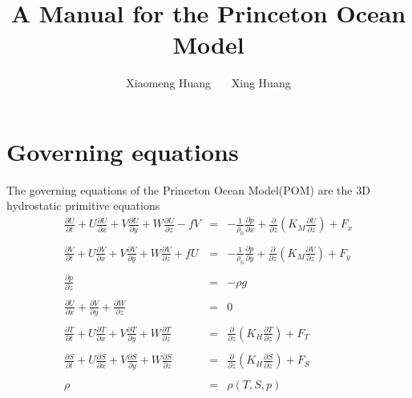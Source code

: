 \documentclass[oribibl]{llncs}
\begin{document}
\title{A Manual for the Princeton Ocean Model}
\author{Xiaomeng Huang \ \ \ Xing Huang}
\maketitle

\section{Governing equations}

The governing equations of the Princeton Ocean Model(POM) are the 3D hydrostatic primitive equations
\begin{eqnarray}
\frac{\partial U}{\partial t}+U\frac{\partial U}{\partial x}+V\frac{\partial U}{\partial y}+W\frac{\partial U}{\partial z} -fV &=& - \frac{1}{\rho_0} \frac{\partial p}{\partial x} + \frac{\partial}{\partial z}  \left ( K_M \frac{\partial U}{\partial z} \right) +F_x\\ \nonumber \\ 
\frac{\partial V}{\partial t}+U\frac{\partial V}{\partial x}+V\frac{\partial V}{\partial y}+W\frac{\partial V}{\partial z} +fU&=& - \frac{1}{\rho_0} \frac{\partial p}{\partial y} + \frac{\partial}{\partial z}  \left ( K_M \frac{\partial V}{\partial z} \right) +F_y\\ \nonumber \\ 
\frac{\partial p}{\partial z} &=& - \rho g \\ \nonumber \\ 
\frac{\partial U}{\partial x} + \frac{\partial V}{\partial y} + \frac{\partial W}{\partial z} &=& 0 \\ \nonumber \\ 
\frac{\partial T}{\partial t}+U\frac{\partial T}{\partial x}+V\frac{\partial T}{\partial y}+W\frac{\partial T}{\partial z} &=& \frac{\partial}{\partial z}  \left ( K_H \frac{\partial T}{\partial z} \right) +F_T \\ \nonumber \\ 
\frac{\partial S}{\partial t}+U\frac{\partial S}{\partial x}+V\frac{\partial S}{\partial y}+W\frac{\partial S}{\partial z} &=& \frac{\partial}{\partial z}  \left ( K_H \frac{\partial S}{\partial z} \right) +F_S\\ \nonumber \\ 
\rho &=& \rho(T,S,p)
\end{eqnarray}
\end{document}
